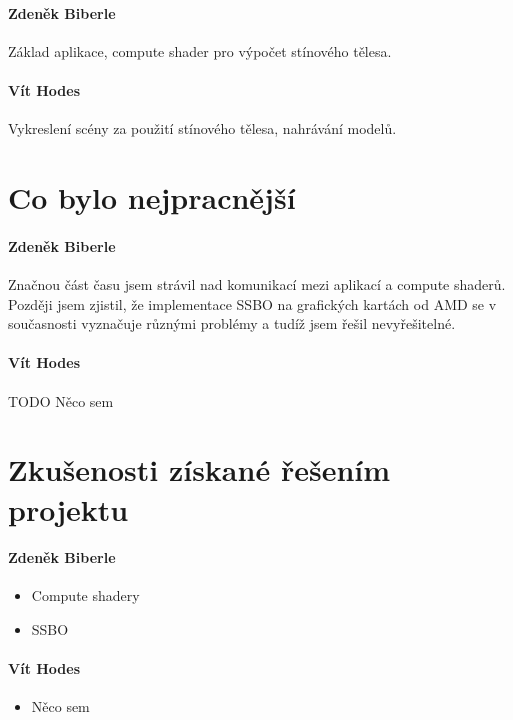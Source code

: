\documentclass[11pt,a4paper]{article}
\begin{document}
\paragraph{Zdeněk Biberle} Základ aplikace, compute shader pro výpočet stínového tělesa.
\paragraph{Vít Hodes} Vykreslení scény za použití stínového tělesa, nahrávání modelů.

\section{Co bylo nejpracnější}

\paragraph{Zdeněk Biberle}

Značnou část času jsem strávil nad komunikací mezi aplikací a compute shaderů. Později jsem zjistil, že implementace SSBO na grafických kartách od AMD se v současnosti vyznačuje různými problémy a tudíž jsem řešil nevyřešitelné.

\paragraph{Vít Hodes} TODO Něco sem

\section{Zkušenosti získané řešením projektu}

\paragraph{Zdeněk Biberle}
\begin{itemize}
	\item Compute shadery
	\item SSBO
\end{itemize}

\paragraph{Vít Hodes}
\begin{itemize}
	\item Něco sem
\end{itemize}
\end{document}
